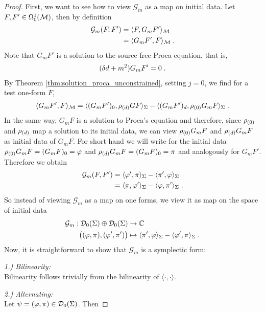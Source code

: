 \begin{proof}
First, we want to see how to view $\mathcal{G}_m$ as a map on initial data. Let $F,F' \in \Omega^1_0(\mathcal{M})$, then by definition
\begin{align}
\mathcal{G}_m(F,F')
&= \langle F , G_m F' \rangle_{\mathcal{M}} \notag\\
&= \langle G_m F' , F \rangle_{\mathcal{M}}  \;.
\end{align}
Note that $G_m F'$ is a solution to the source free Proca equation, that is,
\begin{align}
(\delta d + m^2)G_m F' = 0 \;.
\end{align}
By Theorem \ref{thm:solution_proca_unconstrained}, setting $j=0$, we find for a test one-form $F$,
\begin{align}
 \langle G_m F' , F \rangle_{\mathcal{M}} =  \langle (G_m F')_{0} , \rho_{(d)} GF \rangle_\Sigma - \langle (G_m F')_{d} , \rho_{(0)} G_m F \rangle_\Sigma  \;.
\end{align}
In the same way, $G_m F$ is a solution to Proca's equation and therefore, since $\rho_{(0)}$ and $\rho_{(d)}$ map a solution to its initial data, we can view $\rho_{(0)} G_m F$ and  $\rho_{(d)} G_m F$ as initial data of $G_m F$.
For short hand we will write for the initial data $\rho_{(0)} G_m F = (G_m F)_0 = \varphi$ and  $\rho_{(d)} G_m F = (G_m F)_0 = \pi$ and analogously for $G_m F'$.
Therefore we obtain
\begin{align}
\mathcal{G}_m(F,F') &= \langle \varphi' , \pi \rangle_\Sigma  - \langle \pi' , \varphi \rangle_\Sigma \notag \\
&= \langle \pi , \varphi' \rangle_\Sigma  - \langle \varphi , \pi' \rangle_\Sigma   \;.
\end{align}
So instead of viewing $\mathcal{G}_m$ as a map on one forms, we view it as map on the space of initial data
\begin{align}
\mathcal{G}_m : \mathcal{D}_{0}(\Sigma) \oplus \mathcal{D}_{0}(\Sigma) &\to \mathbb{C}\; \\
\big( (\varphi , \pi) , (\varphi' , \pi')  \big) &\mapsto \langle \pi' , \varphi \rangle_\Sigma - \langle \varphi' , \pi \rangle_\Sigma \;. \notag
\end{align}
Now, it is straightforward to show that $\mathcal{G}_m$ is a symplectic form: \par
%
\textit{1.) Bilinearity: \\}
Bilinearity follows trivially from the bilinearity of $\langle \cdot , \cdot \rangle$. \par
%
\textit{2.) Alternating: \\}
Let $\psi = (\varphi , \pi) \in \mathcal{D}_{0}(\Sigma)$. Then

\end{proof}
